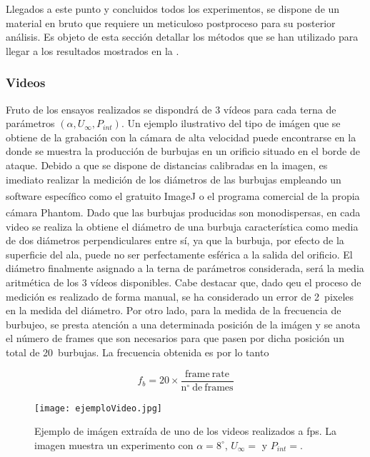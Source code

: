 Llegados a este punto y concluidos todos los experimentos, se dispone de un material en bruto que requiere un meticuloso postproceso para su posterior análisis. Es objeto de esta sección detallar los métodos que se han utilizado para llegar a los resultados mostrados en la . 

\subsubsection*{Videos}

Fruto de los ensayos realizados se dispondrá de 3 vídeos para cada terna de parámetros $\left(\alpha, U_{\infty}, P_{int}\right)$. Un ejemplo ilustrativo del tipo de imágen que se obtiene de la grabación con la cámara de alta velocidad puede encontrarse en la  donde se muestra la producción de burbujas en un orificio situado en el borde de ataque. Debido a que se dispone de distancias calibradas en la imagen, es imediato realizar la medición de los diámetros de las burbujas empleando un software específico como el gratuito ImageJ\textsuperscript{\textregistered} o el programa comercial de la propia cámara Phantom\textsuperscript{\textregistered}. Dado que las burbujas producidas son monodispersas, en cada video se realiza la obtiene el diámetro de una burbuja característica  como media de dos diámetros perpendiculares entre sí, ya que la burbuja, por efecto de la superficie del ala, puede no ser perfectamente esférica a la salida del orificio. El diámetro finalmente asignado a la terna de parámetros considerada, será la media aritmética de los 3 vídeos disponibles. Cabe destacar que, dado qeu el proceso de medición es realizado de forma manual, se ha considerado un error de 2~pixeles en la medida del diámetro. Por otro lado, para la medida de la frecuencia de burbujeo, se presta atención a una determinada posición de la imágen y se anota el número de frames que son necesarios para que pasen por dicha posición un total de 20~burbujas. La frecuencia obtenida es por lo tanto

\begin{equation}
f_{b} = 20 \times \dfrac{\mathrm{frame\ rate}}{\mathrm{n^{\circ}\ de\ frames}}
\end{equation}


\begin{figure}
\centering
\texttt{[image: ejemploVideo.jpg]}
\caption{Ejemplo de imágen extraída de uno de los videos realizados a %
fps. La imagen muestra un experimento con $\alpha = 8^{\circ}$, $U_{\infty} = $ y $P_{int} = $. %
}
\end{figure}

